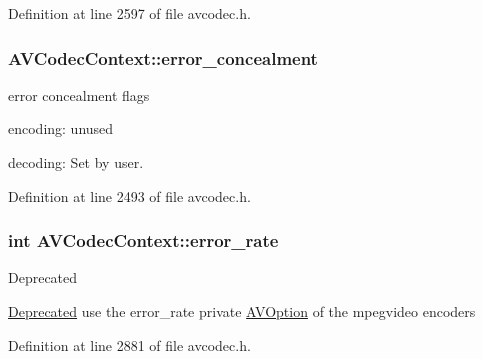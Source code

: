 Definition at line 2597 of file avcodec.\+h.

\subsubsection[{\texorpdfstring{error\+\_\+concealment}{error_concealment}}]{ A\+V\+Codec\+Context\+::error\+\_\+concealment}\hypertarget{struct_a_v_codec_context_a268759f44c37eda9f79048bd0ee05ffc}{}\label{struct_a_v_codec_context_a268759f44c37eda9f79048bd0ee05ffc}
error concealment flags
\begin{DoxyItemize}
\item encoding\+: unused
\item decoding\+: Set by user. 
\end{DoxyItemize}

Definition at line 2493 of file avcodec.\+h.

\subsubsection[{\texorpdfstring{error\+\_\+rate}{error_rate}}]{ {\bf int} A\+V\+Codec\+Context\+::error\+\_\+rate}\hypertarget{struct_a_v_codec_context_ae6c5c21d82ecb2dc36a9180979c81227}{}\label{struct_a_v_codec_context_ae6c5c21d82ecb2dc36a9180979c81227}
\begin{DoxyRefDesc}{Deprecated}
\item[\hyperlink{deprecated__deprecated000022}{Deprecated}]use the \textquotesingle{}error\+\_\+rate\textquotesingle{} private \hyperlink{struct_a_v_option}{A\+V\+Option} of the mpegvideo encoders \end{DoxyRefDesc}


Definition at line 2881 of file avcodec.\+h.

